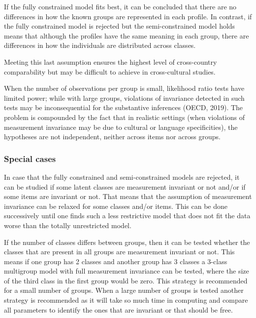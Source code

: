 \documentclass[12pt,a4paper,oneside]{reedthesis}
\begin{document}
If the fully constrained model fits best, it can be concluded that there are no differences in how the known groups are represented in each profile. In contrast, if the fully constrained model is rejected but the semi-constrained model holds means that although the profiles have the same meaning in each group, there are differences in how the individuals are distributed across classes.

Meeting this last assumption ensures the highest level of cross-country comparability but may be difficult to achieve in cross-cultural studies.

When the number of observations per group is small, likelihood ratio tests have limited power; while with large groups, violations of invariance detected in such tests may be inconsequential for the substantive inferences (OECD, 2019). The problem is compounded by the fact that in realistic settings (when violations of measurement invariance may be due to cultural or language specificities), the hypotheses are not independent, neither across items nor across groups.

\hypertarget{special-cases}{%
\subsubsection{Special cases}\label{special-cases}}

In case that the fully constrained and semi-constrained models are rejected, it can be studied if some latent classes are measurement invariant or not and/or if some items are invariant or not. That means that the assumption of measurement invariance can be relaxed for some classes and/or items. This can be done successively until one finds such a less restrictive model that does not fit the data worse than the totally unrestricted model.

If the number of classes differs between groups, then it can be tested whether the classes that are present in all groups are measurement invariant or not. This means if one group has 2 classes and another group has 3 classes a 3-class multigroup model with full measurement invariance can be tested, where the size of the third class in the first group would be zero. This strategy is recommended for a small number of groups. When a large number of groups is tested another strategy is recommended as it will take so much time in computing and compare all parameters to identify the ones that are invariant or that should be free.
\end{document}
